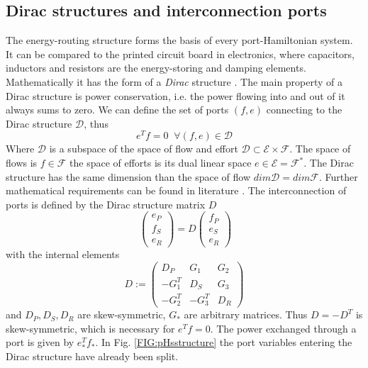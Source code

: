 \documentclass[a4paper,twoside, openright,12pt]{report}
\begin{document}
\subsection{Dirac structures and interconnection ports} \label{SS:PHSinterconnection}
The energy-routing structure forms the basis of every port-Hamiltonian system. It can be compared to the printed circuit board in electronics, where capacitors, inductors and resistors are the energy-storing and damping elements. Mathematically it has the form of a \emph{Dirac} structure \cite{vanderSchaft_06}. The main property of a Dirac structure is power conservation, i.e. the power flowing into and out of it always sums to zero. We can define the set of ports $(f,e)$ connecting to the Dirac structure $\mathcal{D}$, thus 
\begin{equation}
e^Tf = 0 \;  \; \forall (f,e)\in\mathcal{D}
\end{equation}
Where $\mathcal{D}$ is a subspace of the space of flow and effort $\mathcal{D} \subset \mathcal{E}\times \mathcal{F}$. The space of flows is $f \in \mathcal{F}$ the space of efforts is its dual linear space $e \in \mathcal{E} = \mathcal{F}^*$. The Dirac structure has the same dimension than the space of flow $dim \mathcal{D} = dim \mathcal{F}$.
Further mathematical requirements can be found in literature \cite{vanderSchaft_06,Schaft_14}. The interconnection of ports is defined by the Dirac structure matrix $D$
\begin{equation}\
\begin{pmatrix}
e_P \\ f_S \\ e_R
\end{pmatrix} = D \begin{pmatrix}
f_P \\ e_S \\ e_R
\end{pmatrix}
\end{equation}
with the internal elements
\begin{equation}
D :=  \begin{pmatrix}
D_P & G_1 & G_2 \\ -G_1^T & D_S & G_3 \\ -G_2^T & -G_3^T & D_R 
\end{pmatrix}
\end{equation}
and $D_P,D_S,D_R$ are skew-symmetric, $G_*$ are arbitrary matrices. Thus $D = -D^T$ is skew-symmetric, which is necessary for $e^Tf=0$.
The power exchanged through a port is given by $ e_*^Tf_*$. In Fig. \ref{FIG:pHsstructure} the port variables entering the Dirac structure have already been split. 
\end{document}
